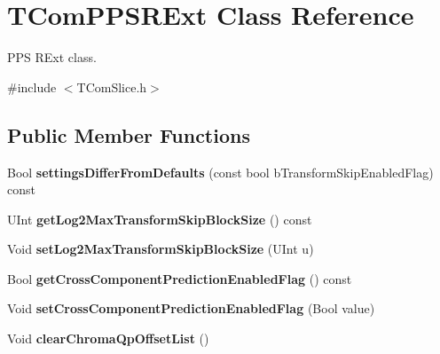 \hypertarget{class_t_com_p_p_s_r_ext}{}\section{T\+Com\+P\+P\+S\+R\+Ext Class Reference}
\label{class_t_com_p_p_s_r_ext}


P\+PS R\+Ext class.  




{\ttfamily \#include $<$T\+Com\+Slice.\+h$>$}

\subsection*{Public Member Functions}
\begin{DoxyCompactItemize}
\item 
\mbox{\label{class_t_com_p_p_s_r_ext_a2babf25f7238b95d333341f2751a8ee4}} 
Bool {\bfseries settings\+Differ\+From\+Defaults} (const bool b\+Transform\+Skip\+Enabled\+Flag) const
\item 
\mbox{\label{class_t_com_p_p_s_r_ext_a9b59cf9c9dd18754d1633e996e516cd4}} 
U\+Int {\bfseries get\+Log2\+Max\+Transform\+Skip\+Block\+Size} () const
\item 
\mbox{\label{class_t_com_p_p_s_r_ext_a782d7349ef1ca9429baa3a3229659b13}} 
Void {\bfseries set\+Log2\+Max\+Transform\+Skip\+Block\+Size} (U\+Int u)
\item 
\mbox{\label{class_t_com_p_p_s_r_ext_ab69e35fd246a2d8d06c0b85c79318009}} 
Bool {\bfseries get\+Cross\+Component\+Prediction\+Enabled\+Flag} () const
\item 
\mbox{\label{class_t_com_p_p_s_r_ext_a67c8f8de90b8aba7289ca11b1d6b6095}} 
Void {\bfseries set\+Cross\+Component\+Prediction\+Enabled\+Flag} (Bool value)
\item 
\mbox{\label{class_t_com_p_p_s_r_ext_a8aa941f003292e514e6a980cc416f47e}} 
Void {\bfseries clear\+Chroma\+Qp\+Offset\+List} ()
\item 
\mbox{\label{class_t_com_p_p_s_r_ext_ac510c7bc1994d57a1c3cd7a2f9cdbdf2}} 

\end{DoxyCompactItemize}

